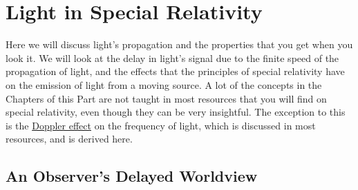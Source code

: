 
%

\part{Light in Special Relativity}\label{Part: light in special relativity}

Here we will discuss light's propagation and the properties that you get when you look it.
We will look at the delay in light's signal due to the finite speed of the propagation of light, and the effects that the principles of special relativity have on the emission of light from a moving source.
A lot of the concepts in the Chapters of this Part are not taught in most resources that you will find on special relativity, even though they can be very insightful.
The exception to this is the \hyperlink{def-doppler-effect}{Doppler effect} on the frequency of light, which is discussed in most resources, and is derived here.

\chapter{An Observer's Delayed Worldview}\label{ch: An Observer's Delayed Worldview}

